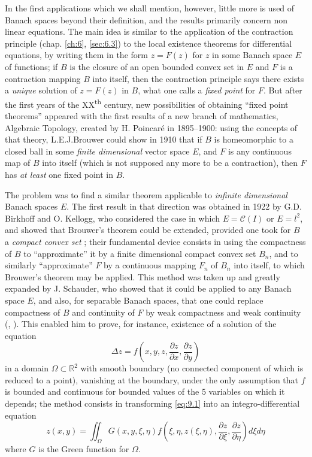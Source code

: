 \documentclass[12pt,a4paper,leqno,twoside]{extbook}
\newcommand{\supth}{\texorpdfstring{\textsuperscript{th}}{th}}
\newcommand{\Cont}{\mathcal{C}}
\newcommand{\R}{\mathbb{R}}
\newcommand{\pder}[2]{\frac{\partial #1}{\partial #2}}
\begin{document}
In the first applications which we shall mention, however, little more is used of Banach spaces beyond their definition, and the results primarily concern non linear equations. The main idea is similar to the application of the contraction principle (chap. \ref{ch:6}, \ref{sec:6.3}) to the local existence theorems for differential equations, by writing them in the form \(z = F(z)\) for \(z\) in some Banach space \(E\) of functions; if \(B\) is the closure of an open bounded convex set in \(E\) and \(F\) is a contraction mapping \(B\) into itself, then the contraction principle says there exists a \emph{unique} solution of \(z = F(z)\) in \(B\), what one calls a \emph{fixed point} for \(F\). But after the first years of the XX\supth{} century, new possibilities of obtaining ``fixed point theorems'' appeared with the first results of a new branch of mathematics, Algebraic Topology, created by H. Poincaré in 1895--1900: using the concepts of that theory, L.E.J.Brouwer could show in 1910 that if \(B\) is homeomorphic to a closed ball in some \emph{finite dimensional} vector space \(E\), and \(F\) is any continuous map of \(B\) into itself (which is not supposed any more to be a contraction), then \(F\) has \emph{at least} one fixed point in \(B\).

The problem was to find a similar theorem applicable to \emph{infinite dimensional} Banach spaces \(E\). The first result in that direction was obtained in 1922 by G.D. Birkhoff and O. Kellogg, who considered the case in which \(E = \Cont(I)\) or \(E = l^2\), and showed that Brouwer's theorem could be extended, provided one took for \(B\) a \emph{compact convex set} \cite{022}; their fundamental device consists in using the compactness of \(B\) to ``approximate'' it by a finite dimensional compact convex set \(B_n\), and to similarly ``approximate'' \(F\) by a continuous mapping \(F_n\) of \(B_n\) into itself, to which Brouwer's theorem may be applied. This method was taken up and greatly expanded by J. Schauder, who showed that it could be applied to any Banach space \(E\), and also, for separable Banach spaces, that one could replace compactness of \(B\) and continuity of \(F\) by weak compactness and weak continuity (\cite{186}, \cite{187}). This enabled him to prove, for instance, existence of a solution of the equation
\begin{equation}
    \label{eq:9.1}
    \Delta z = f\left(x, y, z, \pder{z}{x}, \pder{z}{y}\right)
\end{equation}
in a domain \(\Omega \subset \R^2\) with smooth boundary (no connected component of which is reduced to a point), vanishing at the boundary, under the only assumption that \(f\) is bounded and continuous for bounded values of the 5 variables on which it depends; the method consists in transforming \eqref{eq:9.1} into an integro-differential equation
\begin{equation}
    \label{eq:9.2}
    z(x,y) = \iint_\Omega G(x, y, \xi, \eta) f \left( \xi, \eta, z(\xi, \eta), \pder{z}{\xi}, \pder{z}{\eta} \right) d\xi d\eta
\end{equation}
where \(G\) is the Green function for \(\Omega\).
\end{document}
